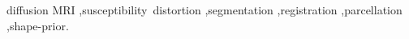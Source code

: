 \documentclass[5p,numbers,sort&compress]{elsarticle}
\begin{document}
\begin{frontmatter}
\begin{abstract}

\end{abstract}

\begin{keyword}
diffusion MRI \sep susceptibility~distortion \sep segmentation %
\sep registration \sep parcellation \sep shape-prior.
\end{keyword}

\end{frontmatter}



%






\appendix






\end{document}
